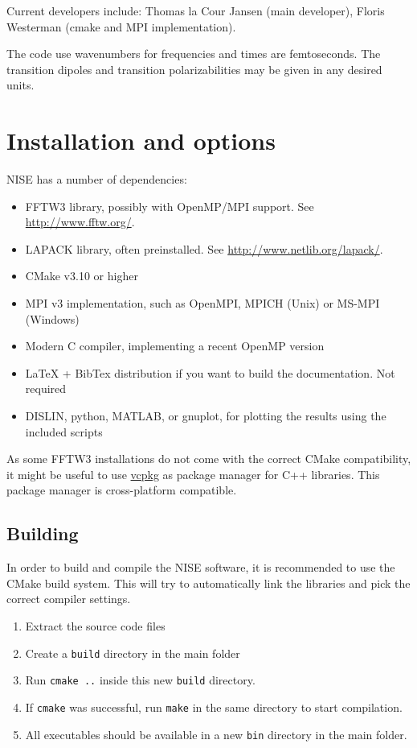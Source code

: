 \documentclass[12pt]{book}
\begin{document}
Current developers include: Thomas la Cour Jansen (main developer), Floris Westerman (cmake and MPI implementation).

The code use wavenumbers for frequencies and times are femtoseconds. The transition
dipoles and transition polarizabilities may be given in any desired units.

\chapter{Installation and options}
NISE has a number of dependencies:
\begin{itemize}
\item FFTW3 library, possibly with OpenMP/MPI support. See \url{http://www.fftw.org/}.
\item LAPACK library, often preinstalled. See \url{http://www.netlib.org/lapack/}.
\item CMake v3.10 or higher
\item MPI v3 implementation, such as OpenMPI, MPICH (Unix) or MS-MPI (Windows)
\item Modern C compiler, implementing a recent OpenMP version
\item LaTeX + BibTex distribution if you want to build the documentation. Not required
\item DISLIN, python, MATLAB, or gnuplot, for plotting the results using the included scripts
\end{itemize}
As some FFTW3 installations do not come with the correct CMake compatibility, it might be useful to use \href{https://github.com/microsoft/vcpkg}{vcpkg} as package manager for C++ libraries. This package manager is cross-platform compatible.

\section{Building}
In order to build and compile the NISE software, it is recommended to use the CMake build system. This will try to automatically link the libraries and pick the correct compiler settings.
\begin{enumerate}
\item Extract the source code files
\item Create a \texttt{build} directory in the main folder
\item Run \texttt{cmake ..} inside this new {\tt build} directory.
\item If {\tt cmake} was successful, run {\tt make} in the same directory to start compilation.
\item All executables should be available in a new {\tt bin} directory in the main folder.
\end{enumerate}
\end{document}
